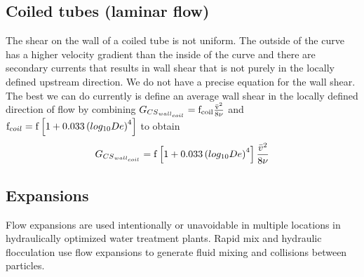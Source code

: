 \documentclass[letterpaper,10pt,english]{sphinxmanual}
\begin{document}
\subsection{Coiled tubes (laminar flow)}
\label{\detokenize{Rapid_Mix/RM_Derivations:heading-coiled-tubes-laminar-flow-1}}\label{\detokenize{Rapid_Mix/RM_Derivations:id1}}
The shear on the wall of a coiled tube is not uniform. The outside of the curve has a higher velocity gradient than the inside of the curve and there are secondary currents that results in wall shear that is not purely in the locally defined upstream direction. We do not have a precise equation for the wall shear. The best we can do currently is define an average wall shear in the locally defined direction of flow by combining
\(G_{{CS}_{wall_{coil}}} =\rm{f_{coil}} \frac{\bar v^2}{8\nu}\) and
\({\rm f}_{coil} = {\rm f} \left[ 1 + 0.033\left(log_{10}De\right)^4 \right]\)
to obtain
\begin{equation}\label{equation:Rapid_Mix/RM_Derivations:Rapid_Mix/RM_Derivations:115}
\begin{split}G_{{CS}_{wall_{coil}}} ={\rm f} \left[ 1 + 0.033 \left(log_{10}De \right)^4 \right]  \frac{\bar v^2}{8\nu}\end{split}
\end{equation}

\subsection{Expansions}
\label{\detokenize{Rapid_Mix/RM_Derivations:heading-expansions-1}}\label{\detokenize{Rapid_Mix/RM_Derivations:id2}}
Flow expansions are used intentionally or unavoidable in multiple locations in hydraulically optimized water treatment plants. Rapid mix and hydraulic flocculation use flow expansions to generate fluid mixing and collisions between particles.
\end{document}
